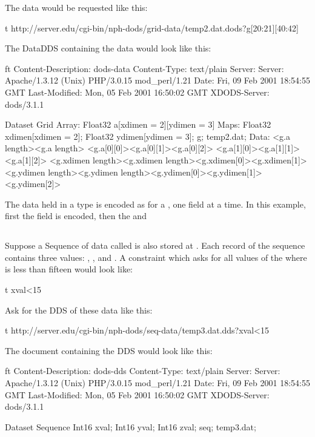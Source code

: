 \documentclass[justify]{nasa-ese}
\begin{document}
The data would be requested like this:

\begin{vcode}{t}
http://server.edu/cgi-bin/nph-dods/grid-data/temp2.dat.dods?g[20:21][40:42]
\end{vcode}

The DataDDS containing the data would look like this:

\begin{vcode}{ft}
Content-Description: dods-data
Content-Type: text/plain
Server: Server: Apache/1.3.12 (Unix)  PHP/3.0.15 mod_perl/1.21
Date: Fri, 09 Feb 2001 18:54:55 GMT
Last-Modified: Mon, 05 Feb 2001 16:50:02 GMT
XDODS-Server: dods/3.1.1

Dataset {
  Grid {
    Array:
      Float32 a[xdimen = 2][ydimen = 3]
    Maps:
      Float32 xdimen[xdimen = 2];
      Float32 ydimen[ydimen = 3];
  } g;
} temp2.dat;
Data:
<g.a length><g.a length>
<g.a[0][0]><g.a[0][1]><g.a[0][2]>
<g.a[1][0]><g.a[1][1]><g.a[1][2]>
<g.xdimen length><g.xdimen length><g.xdimen[0]><g.xdimen[1]>
<g.ydimen length><g.ydimen length><g.ydimen[0]><g.ydimen[1]>
<g.ydimen[2]>
\end{vcode}

The data held in a \Grid type is encoded as for a \Structure, one field at a
time. In this example, first the  field is encoded, then the
 and 

\subsection{\Sequence}

Suppose a Sequence of data called  is also stored at
. Each record of the sequence contains three values:
, , and . A constraint which asks for
all values of the \Sequence where  is less than fifteen
would look like:

\begin{vcode}{t}
xval<15
\end{vcode}

Ask for the DDS of these data like this:

\begin{vcode}{t}
http://server.edu/cgi-bin/nph-dods/seq-data/temp3.dat.dds?xval<15
\end{vcode}

The document containing the DDS would look like this:

\begin{vcode}{ft}
Content-Description: dods-dds
Content-Type: text/plain
Server: Server: Apache/1.3.12 (Unix)  PHP/3.0.15 mod_perl/1.21
Date: Fri, 09 Feb 2001 18:54:55 GMT
Last-Modified: Mon, 05 Feb 2001 16:50:02 GMT
XDODS-Server: dods/3.1.1

Dataset {
  Sequence {
    Int16 xval;
    Int16 yval;
    Int16 zval;
  } seq;
} temp3.dat;
\end{vcode}
\end{document}
